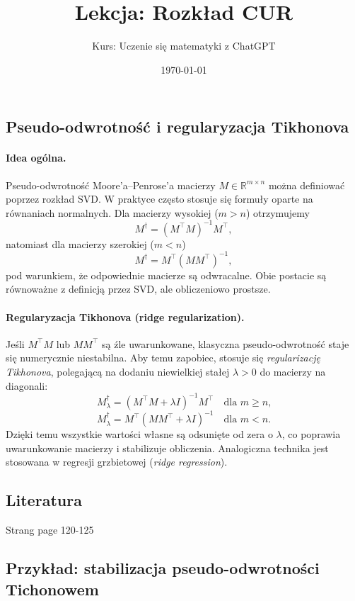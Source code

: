 \documentclass[12pt]{article}
\title{Lekcja: Rozkład CUR}
\author{Kurs: Uczenie się matematyki z ChatGPT}
\date{\today}
\begin{document}
\maketitle



\subsection*{Pseudo-odwrotność i regularyzacja Tikhonova}

\paragraph{Idea ogólna.}
Pseudo-odwrotność Moore'a--Penrose'a macierzy $M\in\mathbb{R}^{m\times n}$
można definiować poprzez rozkład SVD. W praktyce często stosuje się
formuły oparte na równaniach normalnych. Dla macierzy wysokiej ($m>n$)
otrzymujemy
\[
M^{\dagger} = (M^\top M)^{-1}M^\top,
\]
natomiast dla macierzy szerokiej ($m<n$)
\[
M^{\dagger} = M^\top (MM^\top)^{-1},
\]
pod warunkiem, że odpowiednie macierze są odwracalne. 
Obie postacie są równoważne z definicją przez SVD, ale obliczeniowo prostsze.

\paragraph{Regularyzacja Tikhonova (ridge regularization).}
Jeśli $M^\top M$ lub $MM^\top$ są źle uwarunkowane,
klasyczna pseudo-odwrotność staje się numerycznie niestabilna.
Aby temu zapobiec, stosuje się \emph{regularizację Tikhonova}, polegającą
na dodaniu niewielkiej stałej $\lambda>0$ do macierzy na diagonali:
\[
M^{\dagger}_\lambda = (M^\top M + \lambda I)^{-1}M^\top
\quad\text{dla $m\ge n$,}
\]
\[
M^{\dagger}_\lambda = M^\top(MM^\top + \lambda I)^{-1}
\quad\text{dla $m< n$.}
\]
Dzięki temu wszystkie wartości własne są odsunięte od zera o $\lambda$,
co poprawia uwarunkowanie macierzy i stabilizuje obliczenia.
Analogiczna technika jest stosowana w regresji grzbietowej
(\emph{ridge regression}).

\subsection*{Literatura}
Strang page 120-125


\subsection*{Przykład: stabilizacja pseudo-odwrotności Tichonowem}
\end{document}
